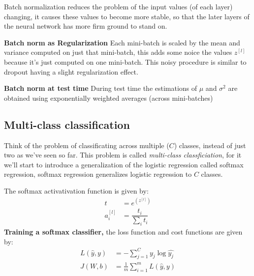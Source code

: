 Batch normalization reduces the problem of the input values (of each layer) changing,
it causes these values to become more stable, so that the later layers of the 
neural network has more firm ground to stand on.

\textbf{Batch norm as Regularization} Each mini-batch is scaled by the mean and variance
computed on just that mini-batch, this adds some noice the values $z^{[l]}$ because
it's just computed on one mini-batch. This noisy procedure is similar to dropout 
having a slight regularization effect. 

\textbf{Batch norm at test time} During test time the estimations of $\mu$ and $\sigma^2$
are obtained using exponentially weighted averages (across mini-batches)

\subsection*{Multi-class classification}

Think of the problem of classificating across multiple ($C$) classes, instead of just two as
we've seen so far. This problem is called \textit{multi-class classficiation}, for it
we'll start to introduce a generalization of the logistic regression called softmax 
regression, softmax regression generalizes logistic regression to $C$ classes. 

The softmax activativation function is given by:
\begin{align*}
    t &= e^{(z^{[l]})} \\
    a_i^{[l]} &= \dfrac{t_i}{\sum_{i} t_i}
\end{align*}
\textbf{Training a softmax classifier,} the loss function and cost functions are given by:
\begin{align*}
    L(\hat{y},y) &= - \sum_{j=1}^C y_j \log{\hat{y_j}} \\
    J(W,b) &= \frac{1}{m} \sum_{i=1}^m L(\hat{y},y)
\end{align*}




